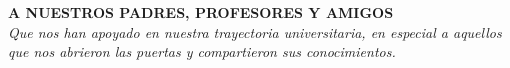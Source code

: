 \chapter*{}
\begin{flushright}
	\vfill
	\textbf{A NUESTROS PADRES, PROFESORES Y AMIGOS}\\
	\textit{Que nos han apoyado en nuestra trayectoria universitaria, en especial a aquellos\\ que nos abrieron las puertas y compartieron sus conocimientos.}
	\vfill
\end{flushright}

\begin{comment}


\chapter*{Agradecimientos}
\vskip 1cm

\paragraph{Nuestros Padres}

Por su amor, trabajo y sacrificio en todos estos años, gracias a ustedes hemos logrado llegar hasta aquí y convertirnos en lo que somos. Ha sido un orgullo y privilegio ser sus hijos, son los mejores padres.
\newline

\paragraph{Dra. Anamim V. Wong.}

Asesora de tesis, deseamos reconocer su valiosa guía, trabajo y dedicación permanente y continua al presente trabajo, así como sus sugerencias y observaciones, siempre inteligentes y oportunas.
\newline

\paragraph{Dra. Jehiely Belem H. C.  \& Ing. Rosel Muñoz López}

Por todas sus aportaciones para el desarrollo de esta tesis, así como reconocer todos los conocimientos que han logrado transmitirnos en las innumerables horas que hemos pasado juntos trabajando en los últimos años, siempre les estaremos agradecidos.
\newline

\paragraph{Nosotros}

Por proteger al mundo de la devastación, por unir a los pueblos dentro de nuestra nación, por denunciar los males de la verdad y el amor, por extender nuestro reino hasta las estrellas. 
\newline

\paragraph{Stack Overflow}
A la gente hermosa de la comunidad.
\end{comment}